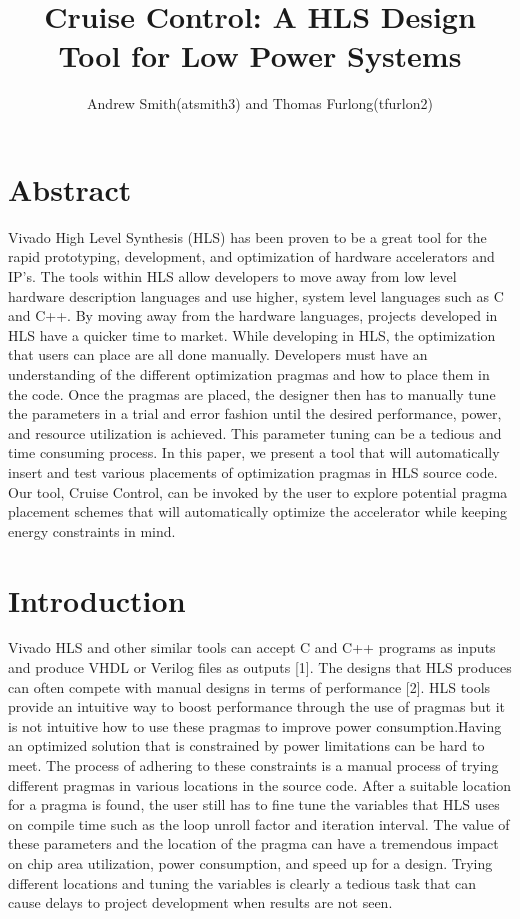 \documentclass[letterpaper, 10 pt, conference]{IEEEconf}  %
\title{\LARGE \bf Cruise Control: A HLS Design Tool for Low Power Systems}
\author{Andrew Smith(atsmith3) and Thomas Furlong(tfurlon2)}%
\begin{document}
\maketitle
\thispagestyle{empty}
\pagestyle{empty}


\section{Abstract}
Vivado High Level Synthesis (HLS) has been proven to be a great tool for the rapid prototyping, development, and optimization of hardware accelerators and IP's. The tools within HLS allow developers to move away from low level hardware description languages and use higher, system level languages such as C and C++. By moving away from the hardware languages, projects developed in HLS have a quicker time to market. While developing in HLS, the optimization that users can place are all done manually. Developers must have an understanding of the different optimization pragmas and how to place them in the code. Once the pragmas are placed, the designer then has to manually tune the parameters in a trial and error fashion until the desired performance, power, and resource utilization is achieved. This parameter tuning can be a tedious and time consuming process. In this paper, we present a tool that will automatically insert and test various placements of optimization pragmas in HLS source code. Our tool, Cruise Control, can be invoked by the user to explore potential pragma placement schemes that will automatically optimize the accelerator while keeping energy constraints in mind.
	

\section{Introduction}
Vivado HLS and other similar tools can accept C and C++ programs as inputs and produce VHDL or Verilog files as outputs [1].  The designs that HLS produces can often compete with manual designs in terms of performance [2]. HLS tools provide an intuitive way to boost performance through the use of pragmas but it is not intuitive how to use these pragmas to improve power consumption.Having an optimized solution that is constrained by power limitations can be hard to meet. The process of adhering to these constraints is a manual process of trying different pragmas in various locations in the source code. After a suitable location for a pragma is found, the user still has to fine tune the variables that HLS uses on compile time such as the loop unroll factor and iteration interval. The value of these parameters and the location of the pragma can have a tremendous impact on chip area utilization, power consumption, and speed up for a design. Trying different locations and tuning the variables is clearly a tedious task that can cause delays to project development when results are not seen.  \newline
\end{document}
